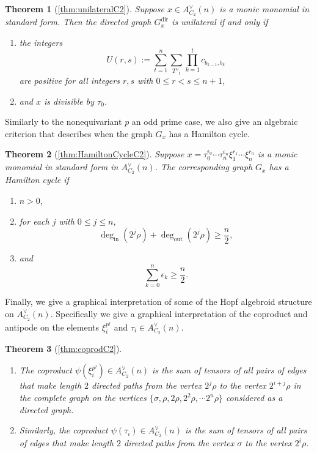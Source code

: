 \documentclass{amsart}
\newtheorem*{thm*}{Theorem}
\theoremstyle{definition}
\theoremstyle{plain}
\numberwithin{theorem}{section}
\numberwithin{equation}{section}
\numberwithin{figure}{section}
\DeclareMathOperator{\out}{out}
\DeclareMathOperator{\inn}{in}
\newcommand{\0}{\langle 0 \rangle }
\begin{document}
\begin{thm*}[\cref{thm:unilateralC2}]
     Suppose $x \in A_{C_2}^\vee(n)$ is a monic monomial { in standard form}. Then the directed graph $G_x^{\text{dir}}$ is unilateral if and only if
    \begin{enumerate}
        \item the integers
        \[
        U(r,s) := \sum_{t=1}^{n}\sum_{{T}''_t}\prod_{k=1}^t c_{b_{k-1},b_k}
        \]
        are positive for all integers $r,s$ with $0 \leq r < s \leq n + 1$, 
        \item and $x$ is divisible by $\tau_0$.
    \end{enumerate}
\end{thm*}

Similarly to the nonequivariant $p$ an odd prime case, we also give an algebraic criterion that describes when the graph $G_x$ has a Hamilton cycle. 

\begin{thm*}[\cref{thm:HamiltonCycleC2}]
    Suppose $x = \tau_0^{\epsilon_0} \cdots \tau_n^{\epsilon_n} \xi_1^{r_1} \cdots \xi_n^{r_n}$ is a monic monomial { in standard form} in $ A_{C_2}^\vee(n)$. The corresponding graph $G_x$ has a Hamilton cycle if
    \begin{enumerate}
        \item $n>0$,
        \item for each $j$ with $0 \leq j \leq n$,
        \[
            \deg_{\inn}(2^j \rho) + \deg_{\out} (2^j \rho) \geq         \frac{n}{2}, 
        \]
        \item and \[\sum_{k=0}^n  \epsilon_k \geq \frac{n}{2}.\]
    \end{enumerate}  
\end{thm*}

Finally, we give a graphical interpretation of some of the Hopf algebroid structure on $A_{C_2}^\vee(n)$. Specifically we give a graphical interpretation of the coproduct and antipode on the elements $\xi_i^{p^j}$ and $\tau_i \in A_{C_2}^\vee (n)$.

\begin{thm*}[\cref{thm:coprodC2}] 
\hfill
\begin{enumerate}

    \item[I.] %
    The coproduct $\psi(\xi_i^{p^j}) \in A^\vee_{C_2}(n)$ is the sum of tensors of all pairs of edges that make length $2$ directed paths from the vertex $2^j \rho $ to the vertex $2^{i + j} \rho$ in the complete graph on the vertices $\{\sigma, \rho, 2 \rho, 2^2 \rho, \cdots 2^n \rho\}$ considered as a directed graph.
    \item[II.] Similarly, the coproduct $\psi(\tau_i) \in A_{C_2}^\vee(n)$ is the sum of tensors of all pairs of edges that make length $2$ directed paths from the vertex $\sigma$ to the vertex $2^i \rho$.
\end{enumerate}
\color{black}
\end{thm*}
\end{document}

